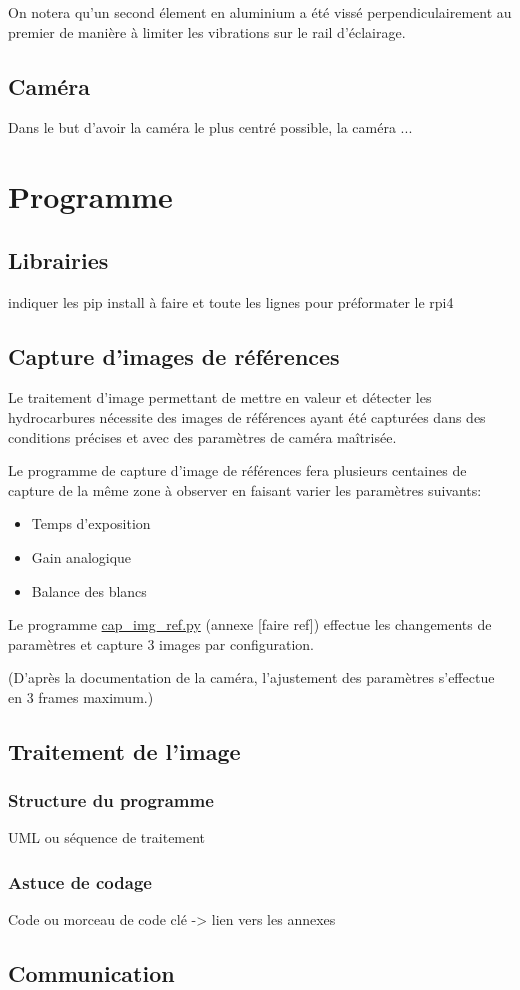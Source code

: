 On notera qu'un second élement en aluminium a été vissé perpendiculairement au premier de manière à limiter les vibrations sur le rail d'éclairage.

\subsection{Caméra}
Dans le but d'avoir la caméra le plus centré possible, la caméra ...
\section{Programme}
\subsection{Librairies}
indiquer les pip install à faire et toute les lignes pour préformater le rpi4
\subsection{Capture d'images de références}
Le traitement d'image permettant de mettre en valeur et détecter les hydrocarbures nécessite des images de références ayant été capturées dans des conditions précises et avec des paramètres de caméra maîtrisée.

Le programme de capture d'image de références fera plusieurs centaines de capture de la même zone à observer en faisant varier les paramètres suivants:
\begin{itemize}
    \item Temps d'exposition
    \item Gain analogique
    \item Balance des blancs
\end{itemize}

Le programme \underline{cap\_img\_ref.py} (annexe [faire ref]) effectue les changements de paramètres et capture 3 images par configuration.

(D'après la documentation de la caméra, l'ajustement des paramètres s'effectue en 3 frames maximum.)
\subsection{Traitement de l'image}
\subsubsection{Structure du programme}
UML ou séquence de traitement
\subsubsection{Astuce de codage}
Code ou morceau de code clé -> lien vers les annexes
\subsection{Communication}
